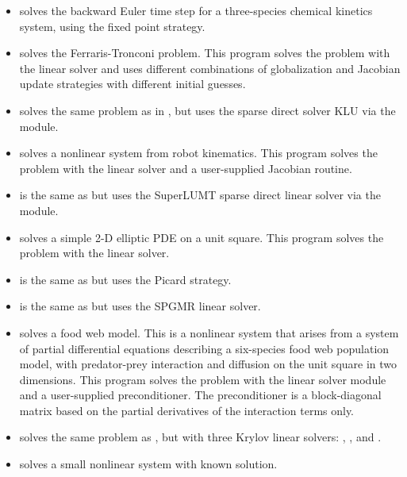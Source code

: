\begin{itemize}
\item {}
  solves the backward Euler time step for a three-species chemical kinetics
  system, using the fixed point strategy.

\item {}
  solves the Ferraris-Tronconi problem.
  \newline
  This program solves the problem with the {\sunlinsoldense} linear solver
  and uses different combinations of globalization and Jacobian
  update strategies with different initial guesses.
\item {}
  solves the same problem as in , but uses the
  sparse direct solver KLU via the {\sunlinsolklu} module.

\item {}
  solves a nonlinear system from robot kinematics.
  \newline
  This program solves the problem with the {\sunlinsoldense} linear solver
  and a user-supplied Jacobian routine.
\item {}
  is the same as  but uses the SuperLUMT sparse direct
  linear solver via the {\sunlinsolslumt} module.

\item {}
  solves a simple 2-D elliptic PDE on a unit square.
 \newline
  This program solves the problem with the {\sunlinsolband} linear solver.
\item {}
  is the same as  but uses the Picard strategy.
\item {}
  is the same as  but uses the SPGMR linear solver.

\item {}
  solves a food web model.
  \newline
  This is a nonlinear system that arises from a system of partial
  differential equations describing a six-species food web population
  model, with predator-prey interaction and diffusion on the unit
  square in two dimensions.
  This program solves the problem with the {\sunlinsolspgmr} linear
  solver module and a user-supplied preconditioner. The preconditioner is a
  block-diagonal matrix based on the partial derivatives of the
  interaction terms only.
\item {}
  solves the same problem as , but with three Krylov
  linear solvers: {\sunlinsolspgmr}, {\sunlinsolspbcgs}, and {\sunlinsolsptfqmr}.

\item {} solves a small nonlinear system with known solution.
  
\end{itemize}

